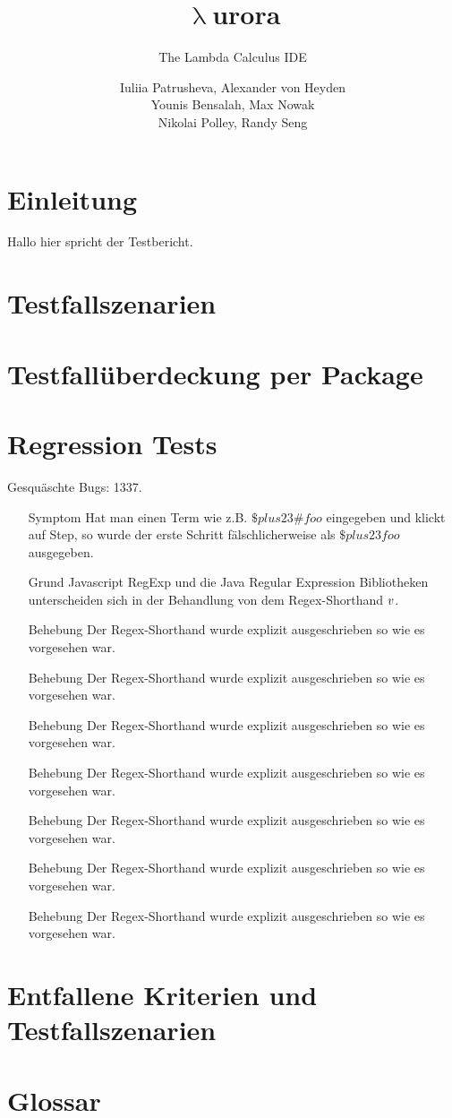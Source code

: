 \documentclass[parskip=full,11pt,twoside]{scrartcl}
\title{\textbf{$\uplambda$}urora}
\subtitle{The Lambda Calculus IDE}
\author{Iuliia Patrusheva, Alexander von Heyden\\
    Younis Bensalah, Max Nowak\\
    Nikolai Polley, Randy Seng}
\begin{document}
    \maketitle
    \tableofcontents
    \newpage

    \section{Einleitung}
    Hallo hier spricht der Testbericht.

    \section{Testfallszenarien}

    \section{Testfallüberdeckung per Package}

    \section{Regression Tests}
    Gesquäschte Bugs: 1337.


    \begin{itemize}
        \item[Symptom]
        Hat man einen Term wie z.B. $\$plus 2 3 \# foo$ eingegeben und klickt auf Step, so wurde der erste Schritt
        fälschlicherweise als $\$plus 2 3 foo$ ausgegeben.
        \item[Grund]
        Javascript RegExp und die Java Regular Expression Bibliotheken unterscheiden sich in der Behandlung von dem
        Regex-Shorthand $\\v$.
        \item[Behebung]
        Der Regex-Shorthand wurde explizit ausgeschrieben so wie es vorgesehen war.
        \item[Behebung]
        Der Regex-Shorthand wurde explizit ausgeschrieben so wie es vorgesehen war.
        \item[Behebung]
        Der Regex-Shorthand wurde explizit ausgeschrieben so wie es vorgesehen war.
        \item[Behebung]
        Der Regex-Shorthand wurde explizit ausgeschrieben so wie es vorgesehen war.
        \item[Behebung]
        Der Regex-Shorthand wurde explizit ausgeschrieben so wie es vorgesehen war.
        \item[Behebung]
        Der Regex-Shorthand wurde explizit ausgeschrieben so wie es vorgesehen war.
        \item[Behebung]
        Der Regex-Shorthand wurde explizit ausgeschrieben so wie es vorgesehen war.
    \end{itemize}

    \section{Entfallene Kriterien und Testfallszenarien}

    \section{Glossar}
\end{document}
